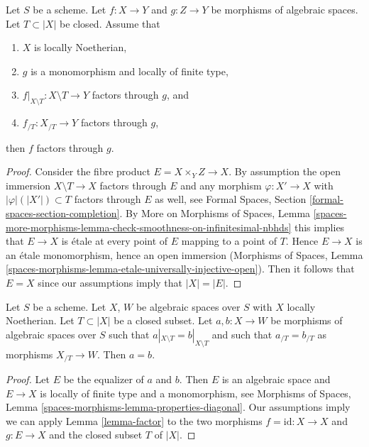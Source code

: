 \begin{lemma}
\label{lemma-factor}
Let $S$ be a scheme. Let $f : X \to Y$ and $g : Z \to Y$ be morphisms
of algebraic spaces. Let $T \subset |X|$ be closed.
Assume that
\begin{enumerate}
\item $X$ is locally Noetherian,
\item $g$ is a monomorphism and locally of finite type,
\item $f|_{X \setminus T} : X \setminus T \to Y$ factors through $g$, and
\item $f_{/T} : X_{/T} \to Y$ factors through $g$,
\end{enumerate}
then $f$ factors through $g$.
\end{lemma}

\begin{proof}
Consider the fibre product $E = X \times_Y Z \to X$.
By assumption the open immersion $X \setminus T \to X$
factors through $E$ and any morphism $\varphi : X' \to X$ with
$|\varphi|(|X'|) \subset T$ factors through $E$ as well, see
Formal Spaces, Section \ref{formal-spaces-section-completion}.
By More on Morphisms of Spaces, Lemma
\ref{spaces-more-morphisms-lemma-check-smoothness-on-infinitesimal-nbhds}
this implies that $E \to X$ is \'etale at every point of $E$
mapping to a point of $T$. Hence $E \to X$ is an \'etale
monomorphism, hence an open immersion
(Morphisms of Spaces, Lemma
\ref{spaces-morphisms-lemma-etale-universally-injective-open}).
Then it follows that $E = X$ since our assumptions imply that $|X| = |E|$.
\end{proof}

\begin{lemma}
\label{lemma-faithful-general}
Let $S$ be a scheme. Let $X$, $W$ be algebraic spaces over $S$ with
$X$ locally Noetherian. Let $T \subset |X|$ be a closed subset.
Let $a, b : X \to W$ be morphisms of algebraic spaces over $S$ such
that $a|_{X \setminus T} = b|_{X \setminus T}$ and such that
$a_{/T} = b_{/T}$ as morphisms $X_{/T} \to W$. Then $a = b$.
\end{lemma}

\begin{proof}
Let $E$ be the equalizer of $a$ and $b$. Then $E$ is an algebraic space
and $E \to X$ is locally of finite type and a monomorphism, see
Morphisms of Spaces, Lemma \ref{spaces-morphisms-lemma-properties-diagonal}.
Our assumptions imply we can apply Lemma \ref{lemma-factor} to the two
morphisms $f = \text{id} : X \to X$ and $g : E \to X$ and the closed
subset $T$ of $|X|$.
\end{proof}

